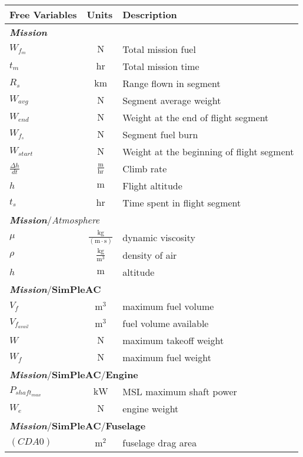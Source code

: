 {\footnotesize
\begin{longtable}{lcl}
\toprule
Free Variables & Units & Description \\ \midrule
\multicolumn{3}{l}{\textbf{\textit{Mission}}} \\
$W_{f_{m}}$ & $~\mathrm{N}$ & Total mission fuel \\
$t_m$ & $~\mathrm{hr}$ & Total mission time \\
$R_s$ & $~\mathrm{km}$ & Range flown in segment \\
$W_{avg}$ & $~\mathrm{N}$ & Segment average weight \\
$W_{end}$ & $~\mathrm{N}$ & Weight at the end of flight segment \\
$W_{f_s}$ & $~\mathrm{N}$ & Segment fuel burn \\
$W_{start}$ & $~\mathrm{N}$ & Weight at the beginning of flight segment \\
$\frac{\Delta h}{dt}$ & $~\mathrm{\tfrac{m}{hr}}$ & Climb rate \\
$h$ & $~\mathrm{m}$ & Flight altitude \\
$t_s$ & $~\mathrm{hr}$ & Time spent in flight segment \\
\hline
\multicolumn{3}{l}{\textbf{\textit{Mission}}/\textit{Atmosphere}} \\
$\mu$ & $~\mathrm{\tfrac{kg}{\left(m\cdot s\right)}}$ & dynamic viscosity \\
$\rho$ & $~\mathrm{\tfrac{kg}{m^{3}}}$ & density of air \\
$h$ & $~\mathrm{m}$ & altitude \\
\hline
\multicolumn{3}{l}{\textbf{\textit{Mission}}/\textbf{SimPleAC}} \\
$V_f$ & $~\mathrm{m^{3}}$ & maximum fuel volume \\
$V_{f_{avail}}$ & $~\mathrm{m^{3}}$ & fuel volume available \\
$W$ & $~\mathrm{N}$ & maximum takeoff weight \\
$W_f$ & $~\mathrm{N}$ & maximum fuel weight \\
\hline
\multicolumn{3}{l}{\textbf{\textit{Mission}}/\textbf{SimPleAC}/\textbf{Engine}} \\
$P_{shaft_{max}}$ & $~\mathrm{kW}$ & MSL maximum shaft power \\
$W_e$ & $~\mathrm{N}$ & engine weight \\
\hline
\multicolumn{3}{l}{\textbf{\textit{Mission}}/\textbf{SimPleAC}/\textbf{Fuselage}} \\
$(CDA0)$ & $~\mathrm{m^{2}}$ & fuselage drag area \\

\end{longtable}}
